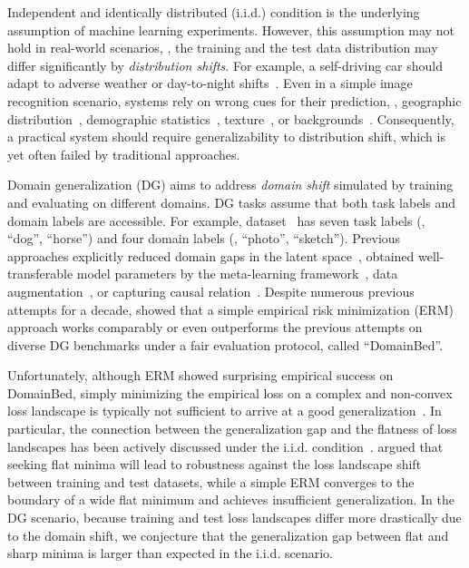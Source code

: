 Independent and identically distributed (i.i.d.) condition is the underlying assumption of machine learning experiments.
However, this assumption may not hold in real-world scenarios, \ie, the training and the test data distribution may differ significantly by \emph{distribution shifts}.
For example, a self-driving car should adapt to adverse weather or day-to-night shifts~\cite{dai2018dark, michaelis2019benchmarking}.
Even in a simple image recognition scenario, systems rely on wrong cues for their prediction, \eg, geographic distribution~\cite{de2019does}, demographic statistics~\cite{yang2020towards}, texture~\cite{geirhos2019cnn_biased_towards_texture}, or backgrounds~\cite{beery2018recognition}.
Consequently, a practical system should require generalizability to distribution shift, which is yet often failed by traditional approaches.

Domain generalization (DG) aims to address \emph{domain shift} simulated by training and evaluating on different domains.
DG tasks assume that both task labels and domain labels are accessible. For example,  dataset~\cite{li2017pacs} has seven task labels (\eg, ``dog'', ``horse'') and four domain labels (\eg, ``photo'', ``sketch'').
Previous approaches explicitly reduced domain gaps in the latent space~\cite{muandet2013icml_DIFL,ganin2016dann,li2018cdann,bahng2019rebias,zhao2020er_entropy_regularization}, obtained well-transferable model parameters by the meta-learning framework~\cite{li2018mldg,dou2019masf,balaji2018metareg,zhang2020arm}, data augmentation~\cite{zhou2021mixstyle,shankar2018crossgrad,carlucci2019jigsaw_jigen}, or capturing causal relation~\cite{arjovsky2019irm,krueger2020vrex}.
Despite numerous previous attempts for a decade, \citet{gulrajani2020domainbed} showed that a simple empirical risk minimization (ERM) approach works comparably or even outperforms the previous attempts on diverse DG benchmarks under a fair evaluation protocol, called ``DomainBed''.

Unfortunately, although ERM showed surprising empirical success on DomainBed, simply minimizing the empirical loss on a complex and non-convex loss landscape is typically not sufficient to arrive at a good generalization~\cite{keskar2016largebatch,garipov2018fge,izmailov2018swa,foret2020sharpness}.
In particular, the connection between the generalization gap and the flatness of loss landscapes has been actively discussed under the i.i.d. condition~\cite{keskar2016largebatch,dziugaite2017computing,garipov2018fge,izmailov2018swa,jiang2019fantastic,foret2020sharpness}.
\citet{izmailov2018swa} argued that seeking flat minima will lead to robustness against the loss landscape shift between training and test datasets, while a simple ERM converges to the boundary of a wide flat minimum and achieves insufficient generalization.
In the DG scenario, because training and test loss landscapes differ more drastically due to the domain shift, we conjecture that the generalization gap between flat and sharp minima is larger than expected in the i.i.d. scenario.


